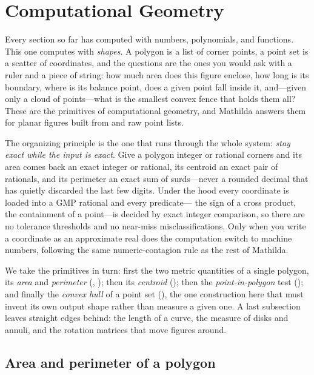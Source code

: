 \section{Computational Geometry}
\label{sec:geometry}

Every section so far has computed with numbers, polynomials, and functions. This
one computes with \emph{shapes}. A polygon is a list of corner points, a point
set is a scatter of coordinates, and the questions are the ones you would ask
with a ruler and a piece of string: how much area does this figure enclose, how
long is its boundary, where is its balance point, does a given point fall inside
it, and---given only a cloud of points---what is the smallest convex fence that
holds them all? These are the primitives of computational
geometry, and Mathilda answers them for planar
figures built from  and raw point lists.

The organizing principle is the one that runs through the whole system:
\emph{stay exact while the input is exact}. Give a polygon integer or rational
corners and its area comes back an exact integer or rational, its centroid an
exact pair of rationals, and its perimeter an exact sum of surds---never a
rounded decimal that has quietly discarded the last few digits. Under the hood
every coordinate is loaded into a GMP rational and every predicate---
the sign of a cross product, the containment of a point---is decided by exact
integer comparison, so there are no tolerance thresholds and no near-miss
misclassifications. Only when you write a coordinate as an approximate real does
the computation switch to machine numbers, following the same numeric-contagion
rule as the rest of Mathilda.

We take the primitives in turn: first the two metric quantities of a single
polygon, its \emph{area} and \emph{perimeter} (, ); then its
\emph{centroid} (); then the \emph{point-in-polygon} test
(); and finally the \emph{convex hull} of a point set
(), the one construction here that must invent its own output
shape rather than measure a given one. A last subsection leaves straight edges behind:
the length of a curve, the measure of disks and annuli, and the rotation matrices that
move figures around.

\subsection{Area and perimeter of a polygon}
\label{ssec:geo-area}

